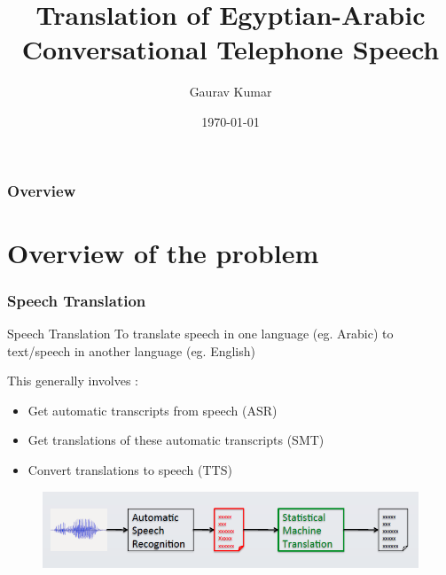 \documentclass{beamer}
\title[Translation of Egyptian-Arabic CTS]{Translation of Egyptian-Arabic Conversational Telephone Speech} %
\author{Gaurav Kumar} %
\institute[JHU] %
{
Advisors : Graeme Blackwood, Yaser Al-onaizan, Abe Ittycheriah\\
IBM Research, Johns Hopkins University \\ %
\textit{gkumar@cs.jhu.edu} %
}
\date{\today} %
\begin{document}
\begin{frame}
\titlepage %
\end{frame}

\begin{frame}
\frametitle{Overview} %
\tableofcontents %
\end{frame}


\section{Overview of the problem} %

\begin{frame}
\frametitle{Speech Translation}
\begin{block}{Speech Translation}
To translate speech in one language (eg. Arabic) to text/speech in another language (eg. English)
\end{block} 
This generally involves :
\begin{itemize}
	\item Get automatic transcripts from speech (ASR)
	\item Get translations of these automatic transcripts (SMT)
	\item Convert translations to speech (TTS)
\end{itemize}
\begin{figure}
\includegraphics[width=0.8\linewidth]{pipeline.png}
\end{figure}
\end{frame}
\end{document}
